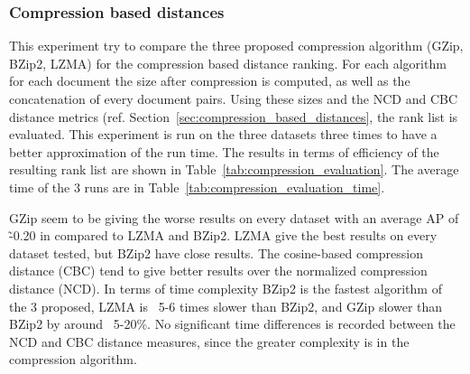 \subsubsection{Compression based distances}

This experiment try to compare the three proposed compression algorithm (GZip, BZip2, LZMA) for the compression based distance ranking.
For each algorithm for each document the size after compression is computed, as well as the concatenation of every document pairs.
Using these sizes and the NCD and CBC distance metrics (ref. Section~\ref{sec:compression_based_distances}, the rank list is evaluated.
This experiment is run on the three datasets three times to have a better approximation of the run time.
The results in terms of efficiency of the resulting rank list are shown in Table~\ref{tab:compression_evaluation}.
The average time of the 3 runs are in Table~\ref{tab:compression_evaluation_time}.

GZip seem to be giving the worse results on every dataset with an average AP of \~-0.20 in compared to LZMA and BZip2.
LZMA give the best results on every dataset tested, but BZip2 have close results.
The cosine-based compression distance (CBC) tend to give better results over the normalized compression distance (NCD).
In terms of time complexity BZip2 is the fastest algorithm of the 3 proposed, LZMA is ~5-6 times slower than BZip2, and GZip slower than BZip2 by around ~5-20\%.
No significant time differences is recorded between the NCD and CBC distance measures, since the greater complexity is in the compression algorithm.

